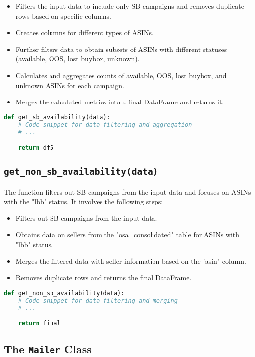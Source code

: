 \begin{itemize}
    \item Filters the input data to include only SB campaigns and removes duplicate rows based on specific columns.
    \item Creates columns for different types of ASINs.
    \item Further filters data to obtain subsets of ASINs with different statuses (available, OOS, lost buybox, unknown).
    \item Calculates and aggregates counts of available, OOS, lost buybox, and unknown ASINs for each campaign.
    \item Merges the calculated metrics into a final DataFrame and returns it.
\end{itemize}

\begin{lstlisting}[language=Python]
def get_sb_availability(data):
    # Code snippet for data filtering and aggregation
    # ...

    return df5
\end{lstlisting}

\subsection{\texttt{get\_non\_sb\_availability(data)}}
The function filters out SB campaigns from the input data and focuses on ASINs with the "lbb" status. It involves the following steps:

\begin{itemize}
    \item Filters out SB campaigns from the input data.
    \item Obtains data on sellers from the "osa\_consolidated" table for ASINs with "lbb" status.
    \item Merges the filtered data with seller information based on the "asin" column.
    \item Removes duplicate rows and returns the final DataFrame.
\end{itemize}

\begin{lstlisting}[language=Python]
def get_non_sb_availability(data):
    # Code snippet for data filtering and merging
    # ...

    return final
\end{lstlisting}

\subsection{The \texttt{Mailer} Class}


